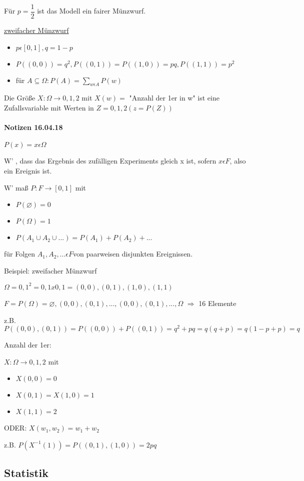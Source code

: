 \documentclass[paper=a4, fontsize=11pt]{scrartcl}
\numberwithin{equation}{section}
\numberwithin{figure}{section}
\numberwithin{table}{section}
\begin{document}
Für $p= \dfrac{1}{2}$ ist das Modell ein fairer Münzwurf.

\underline{zweifacher Münzwurf}

\begin{itemize}
\item $p \epsilon [0,1], q = 1-p$
\item $P({(0,0)}) = q^{2}, P({(0,1)})=P({(1,0)})= pq, P({(1,1)})= p^{2}$
\item für $A \subseteq \Omega : P(A) = \sum _{w \epsilon A} P({w})$
\end{itemize}

Die Größe $X: \Omega \rightarrow {0,1,2}$ mit $X(w)=$ "Anzahl der 1er in w" ist eine Zufallsvariable mit Werten in $Z = {0,1,2} (z = P (Z))$


\paragraph{Notizen 16.04.18}

$P ({x}) = x \epsilon \Omega $

W' , dass das Ergebnis des zufälligen Experiments gleich x ist, sofern ${x} \epsilon F$, also ein Ereignis ist.

W' maß $P: F \rightarrow [0,1]$ mit 
\begin{itemize}
\item $P( \varnothing ) = 0$
\item $P( \Omega ) = 1$
\item $P(A_{1} \cup A_{2} \cup ... ) = P(A_{1})+P(A_{2})+... $
\end{itemize}
für Folgen $A_{1}, A_{2},... \epsilon F$von paarweisen disjunkten Ereignissen.

Beispiel: zweifacher Münzwurf

$\Omega = {0,1} ^{2} = {0,1} x {0,1} = {(0,0),(0,1),(1,0),(1,1)}$

$F = P( \Omega ) = {\varnothing , {(0,0)}, {(0,1)}, ... , {(0,0),(0,1)}, ... , \Omega }$ $\Rightarrow$ 16 Elemente

z.B. $P({(0,0),(0,1)}) = P({(0,0)})+P({(0,1)}) = q^{2}+ pq = q (q+p) = q (1-p+p) = q $

Anzahl der 1er:

$X: \Omega \rightarrow {0,1,2}$ mit
\begin{itemize}
\item $X(0,0)=0$
\item $X(0,1)= X(1,0)=1$
\item $X(1,1)= 2$
\end{itemize}

ODER: $X(w_{1},w_{2})=w_{1}+w_{2}$

z.B. $P(X^{-1}({1})) = P({(0,1),(1,0)})= 2pq$


\subsection{Statistik}
\end{document}
